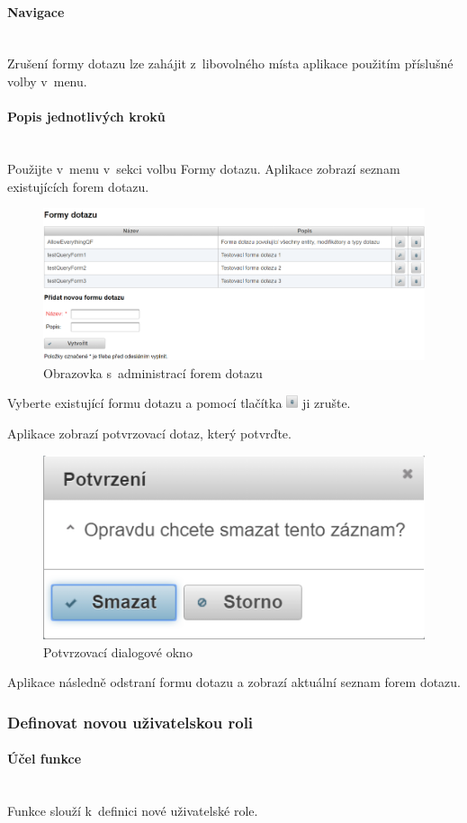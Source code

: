 \documentclass[thesis=M,czech]{FITthesis}[2019/12/23]
\newcommand{\lbparagraph}[1]{\paragraph{#1}\mbox{}\\} %
\newenvironment{reusefigure}[2][htbp]
  {\addtocounter{figure}{-1}%
   \renewcommand{\theHfigure}{dupe-fig}%
   \renewcommand{\thefigure}{\ref{#2}}%
   \renewcommand{\addcontentsline}[3]{}%
   \begin{figure}[#1]}
  {\end{figure}} %
\begin{document}
\lbparagraph{Navigace}
Zrušení formy dotazu lze zahájit z~libovolného místa aplikace použitím příslušné volby v~menu.

\lbparagraph{Popis jednotlivých kroků}
Použijte v~menu v~sekci  volbu Formy dotazu.
Aplikace zobrazí seznam existujících forem dotazu.

\begin{reusefigure}[H]{fig:Obrazovka s~administrací forem dotazu}
  \includegraphics[width=\textwidth]{res/guide/QueryForms.png}
  \caption{Obrazovka s~administrací forem dotazu}
\end{reusefigure}

Vyberte existující formu dotazu a pomocí tlačítka \includegraphics[height=1em]{res/guide/RemoveIcon.png} ji zrušte.

Aplikace zobrazí potvrzovací dotaz, který potvrďte. 

\begin{figure}[H]
  \centering
  \includegraphics[scale=0.5]{res/guide/ConfirmationDialog.png}
  \caption{Potvrzovací dialogové okno}
  \label{fig:Potvrzovací dialogové okno}
\end{figure}

Aplikace následně odstraní formu dotazu a zobrazí aktuální seznam forem dotazu.

\subsubsection{Definovat novou uživatelskou roli}
\lbparagraph{Účel funkce}
Funkce slouží k~definici nové uživatelské role.
\end{document}
